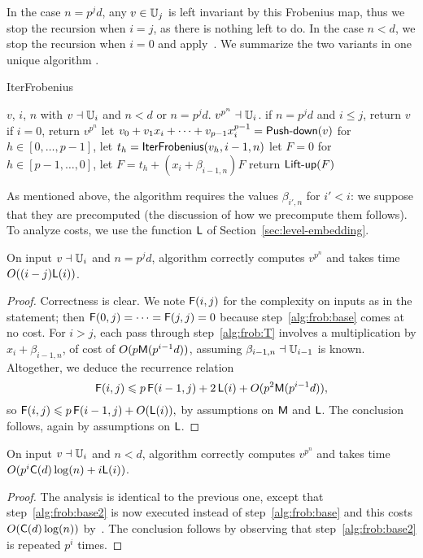 In the case $n=p^jd$, any $v \in \mathbb{U}_j$ is left invariant by this
Frobenius map, thus we stop the recursion when $i=j$, as there is
nothing left to do. In the case $n<d$, we stop the recursion when
$i=0$ and apply~\cite[Algorithm 5.2]{vzGS92}. We summarize the two
variants in one unique algorithm .
\begin{algorithm}
  \caption{IterFrobenius} 
  \begin{algorithmic}[1]
    \REQUIRE $v$, $i$, $n$ with $v\dashv\mathbb{U}_i$ and $n<d$ or $n=p^jd$.
    \ENSURE $v^{p^n} \dashv \mathbb{U}_i$.
    \STATE \label{alg:frob:base} if $n=p^jd$ and $i \le j$, return $v$
    \STATE \label{alg:frob:base2} if $i=0$, return $v^{p^n}$
    \STATE \label{alg:frob:push} let $v_0 + v_1 x_i + \dots + v_{p-1} x_i^{p-1}=\text{{\sf Push-down}}(v)$
    \STATE \label{alg:frob:rec} for $h \in [0,\dots,p-1]$, let $t_h = {\sf IterFrobenius}(v_h, i-1, n)$
    \STATE let $F=0$
    \STATE\label{alg:frob:T} for $h \in [p-1,\dots,0]$, let $F = t_h +  (x_i+\beta_{i-1,n})F$
    \STATE \label{alg:frob:lift} return $\text{{\sf Lift-up}}(F)$
  \end{algorithmic}
\end{algorithm}

As mentioned above, the algorithm requires the values $\beta_{i',n}$
for $i'<i$: we suppose that they are precomputed (the discussion of
how we precompute them follows).  To analyze costs, we use the
function $\mathsf{L}$ of Section~\ref{sec:level-embedding}.
\begin{theorem}
  \label{th:b-ifrob}
  On input $v\dashv\mathbb{U}_i$ and $n=p^jd$, algorithm 
  correctly computes $v^{p^n}$ and takes time $O((i-j)\mathsf{L}(i))$.
\end{theorem}
\begin{proof} Correctness is clear. We note $\mathrm{\sf F}(i,j)$ for the complexity
on inputs as in the statement; then $\mathrm{\sf F}(0,j)=\cdots=\mathrm{\sf F}(j,j)=0$
because step~\ref{alg:frob:base} comes at no cost. For $i>j$, each
pass through step~\ref{alg:frob:T} involves a multiplication by
$x_i+\beta_{i-1,n}$, of cost of $O(p\mathrm{\sf M}(p^{i-1}d))$, assuming
$\beta_{i-1,n}\dashv \mathbb{U}_{i-1}$ is known. Altogether, we deduce the
recurrence relation
$$\mathrm{\sf F}(i,j) \leqslant
p\,\mathrm{\sf F}(i-1,j)+2\,\mathsf{L}(i)+O(p^2\mathrm{\sf M}(p^{i-1}d)),$$ so $\mathrm{\sf F}(i,j) \leqslant
p\,\mathrm{\sf F}(i-1,j)+O(\mathsf{L}(i)),$ by assumptions on $\mathrm{\sf M}$ and $\mathsf{L}$.  The
conclusion follows, again by assumptions on $\mathsf{L}$.\end{proof}

\begin{theorem}
  \label{th:l-ifrob}
  On input $v\dashv\mathbb{U}_i$ and $n<d$, algorithm 
  correctly computes $v^{p^n}$ and takes time $O(p^i\mathrm{\sf C}(d)\log
  (n) + i\mathsf{L}(i))$.
\end{theorem}
\begin{proof} The analysis is identical to the previous one, except that
step~\ref{alg:frob:base2} is now executed instead of
step~\ref{alg:frob:base} and this costs $O(\mathrm{\sf C}(d)\log (n))$
by~\cite[Lemma 5.3]{vzGS92}. The conclusion follows by observing that
step~\ref{alg:frob:base2} is repeated $p^i$ times. \end{proof}


